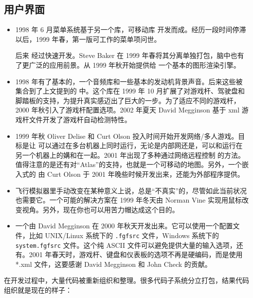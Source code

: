 \subsection{用户界面}
\begin{itemize}
\item 1998 年 6 月菜单系统基于另一个库，可移动库\PLIB{} 开发而成。经历一段时间停滞以后，1999 年春，第一版可工作的菜单项问世。

后来 \PLIB{} 经过快速开发。Steve Baker 在 1999 年春将其分离单独打包，脑中也有了更广泛的应用前景。从 1999 年秋开始提供给 \FlightGear{} 一个基本的图形渲染引擎。
\item 1998 年有了基本的，一个音频库和一些基本的发动机背景声音。后来这些被集合到了上文提到的 \PLIB{} 中。这个库在 1999 年 10 月扩展了对游戏杆、驾驶盘和脚踏板的支持，为提升真实感迈出了巨大的一步。为了适应不同的游戏杆，2000 年秋引入了游戏杆配置选项。2002 年夏天 David Megginson 基于 xml 游戏杆文件开发了游戏杆自动检测特性。
\item 1999 年秋 Oliver Delise  和 Curt Olson 投入时间开始开发网络/多人游戏。目标是让 \FlightGear{} 可以通过在多台机器上同时运行，无论是内部网还是，可以和运行在另一个机器上的媾和在一起。2001 年出现了多种通过网络远程控制 \FlightGear{} 的方法。值得注意的是还有对“Atlas”的支持，也就是一个可移动的地图。另外，一个嵌入式的 由 Curt Olson 于 2001 年晚些时候开发出来，还能为外部程序提供。
\item 飞行模拟器里手动改变在某种意义上说，总是“不真实”的，尽管如此当前状况也需要它。一个可能的解决方案在 1999 年冬天由 Norman Vine 实现用鼠标改变视角。另外，现在你也可以用苦力帽达成这个目的。
\item 一个由 David Megginson 在 2000 年秋天开发出来。它可以使用一个配置文件，比如 UNIX/Linux 系统下的 \texttt{.fgfsrc} 文件，Windows 系统下的 \texttt{system.fgfsrc} 文件。这个纯 ASCII 文件可以避免提供大量的输入选项，还有。2001 年春天时，游戏杆、键盘和仪表板的选项不再是硬编码，而是使用 *.xml 文件，这要感谢 David Megginson 和 John
Check 的贡献。
\end{itemize}

在开发过程中，大量代码被重新组织和整理。很多代码子系统分立打包，结果代码组织就是现在的样子：
\medskip


